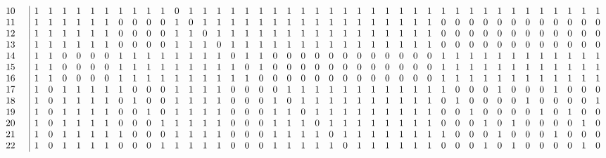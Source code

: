 \documentclass{article}
\begin{document}
{{$$\begin{array}{rr|*{41}r}
10 &  & 1 & 1 & 1 & 1 & 1 & 1 & 1 & 1 & 1 & 1 & 0 & 1 & 1 & 1 & 1 & 1 & 1 & 1 & 1 & 1 & 1 & 1 & 1 & 1 & 1 & 1 & 1 & 1 & 1 & 1 & 1 & 1 & 1 & 1 & 1 & 1 & 1 & 1 & 1 & 1 & 1\\
11 &  & 1 & 1 & 1 & 1 & 1 & 1 & 0 & 0 & 0 & 0 & 1 & 0 & 1 & 1 & 1 & 1 & 1 & 1 & 1 & 1 & 1 & 1 & 1 & 1 & 1 & 1 & 1 & 1 & 1 & 0 & 0 & 0 & 0 & 0 & 0 & 0 & 0 & 0 & 0 & 0 & 0\\
12 &  & 1 & 1 & 1 & 1 & 1 & 1 & 0 & 0 & 0 & 0 & 1 & 1 & 0 & 1 & 1 & 1 & 1 & 1 & 1 & 1 & 1 & 1 & 1 & 1 & 1 & 1 & 1 & 1 & 1 & 0 & 0 & 0 & 0 & 0 & 0 & 0 & 0 & 0 & 0 & 0 & 0\\
13 &  & 1 & 1 & 1 & 1 & 1 & 1 & 0 & 0 & 0 & 0 & 1 & 1 & 1 & 0 & 1 & 1 & 1 & 1 & 1 & 1 & 1 & 1 & 1 & 1 & 1 & 1 & 1 & 1 & 1 & 0 & 0 & 0 & 0 & 0 & 0 & 0 & 0 & 0 & 0 & 0 & 0\\
14 &  & 1 & 1 & 0 & 0 & 0 & 0 & 1 & 1 & 1 & 1 & 1 & 1 & 1 & 1 & 0 & 1 & 1 & 0 & 0 & 0 & 0 & 0 & 0 & 0 & 0 & 0 & 0 & 0 & 0 & 1 & 1 & 1 & 1 & 1 & 1 & 1 & 1 & 1 & 1 & 1 & 1\\
15 &  & 1 & 1 & 0 & 0 & 0 & 0 & 1 & 1 & 1 & 1 & 1 & 1 & 1 & 1 & 1 & 0 & 1 & 0 & 0 & 0 & 0 & 0 & 0 & 0 & 0 & 0 & 0 & 0 & 0 & 1 & 1 & 1 & 1 & 1 & 1 & 1 & 1 & 1 & 1 & 1 & 1\\
16 &  & 1 & 1 & 0 & 0 & 0 & 0 & 1 & 1 & 1 & 1 & 1 & 1 & 1 & 1 & 1 & 1 & 0 & 0 & 0 & 0 & 0 & 0 & 0 & 0 & 0 & 0 & 0 & 0 & 0 & 1 & 1 & 1 & 1 & 1 & 1 & 1 & 1 & 1 & 1 & 1 & 1\\
17 &  & 1 & 0 & 1 & 1 & 1 & 1 & 1 & 0 & 0 & 0 & 1 & 1 & 1 & 1 & 0 & 0 & 0 & 0 & 1 & 1 & 1 & 1 & 1 & 1 & 1 & 1 & 1 & 1 & 1 & 1 & 0 & 0 & 0 & 1 & 0 & 0 & 0 & 1 & 0 & 0 & 0\\
18 &  & 1 & 0 & 1 & 1 & 1 & 1 & 0 & 1 & 0 & 0 & 1 & 1 & 1 & 1 & 0 & 0 & 0 & 1 & 0 & 1 & 1 & 1 & 1 & 1 & 1 & 1 & 1 & 1 & 1 & 0 & 1 & 0 & 0 & 0 & 0 & 1 & 0 & 0 & 0 & 0 & 1\\
19 &  & 1 & 0 & 1 & 1 & 1 & 1 & 0 & 0 & 1 & 0 & 1 & 1 & 1 & 1 & 0 & 0 & 0 & 1 & 1 & 0 & 1 & 1 & 1 & 1 & 1 & 1 & 1 & 1 & 1 & 0 & 0 & 1 & 0 & 0 & 0 & 0 & 1 & 0 & 1 & 0 & 0\\
20 &  & 1 & 0 & 1 & 1 & 1 & 1 & 0 & 0 & 0 & 1 & 1 & 1 & 1 & 1 & 0 & 0 & 0 & 1 & 1 & 1 & 0 & 1 & 1 & 1 & 1 & 1 & 1 & 1 & 1 & 0 & 0 & 0 & 1 & 0 & 1 & 0 & 0 & 0 & 0 & 1 & 0\\
21 &  & 1 & 0 & 1 & 1 & 1 & 1 & 1 & 0 & 0 & 0 & 1 & 1 & 1 & 1 & 0 & 0 & 0 & 1 & 1 & 1 & 1 & 0 & 1 & 1 & 1 & 1 & 1 & 1 & 1 & 1 & 0 & 0 & 0 & 1 & 0 & 0 & 0 & 1 & 0 & 0 & 0\\
22 &  & 1 & 0 & 1 & 1 & 1 & 1 & 0 & 0 & 0 & 1 & 1 & 1 & 1 & 1 & 0 & 0 & 0 & 1 & 1 & 1 & 1 & 1 & 0 & 1 & 1 & 1 & 1 & 1 & 1 & 0 & 0 & 0 & 1 & 0 & 1 & 0 & 0 & 0 & 0 & 1 & 0\\

\end{array}$$}}
\end{document}
